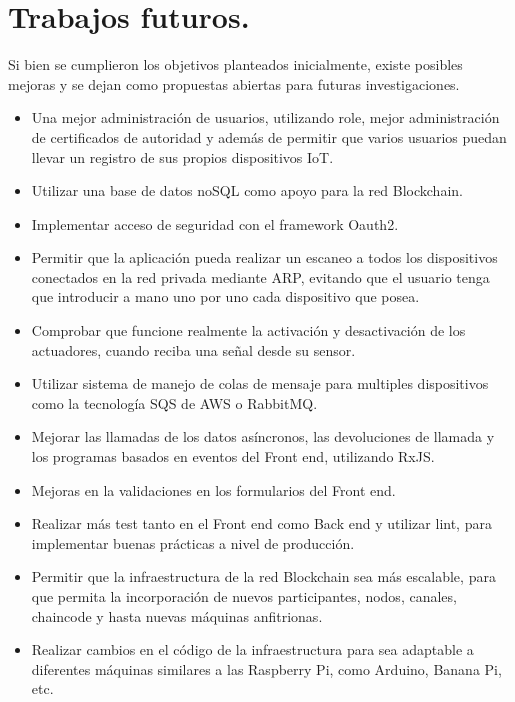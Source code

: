 \section{Trabajos futuros.}

Si bien se cumplieron los objetivos planteados inicialmente, existe posibles mejoras y se dejan como propuestas abiertas
para futuras investigaciones.

\begin{itemize}
  \item Una mejor administración de usuarios, utilizando role, mejor administración de certificados de autoridad y además
  de permitir que varios usuarios puedan llevar un registro de sus propios dispositivos IoT.
  \item Utilizar una base de datos noSQL como apoyo para la red Blockchain.
  \item Implementar acceso de seguridad con el framework Oauth2.
  \item Permitir que la aplicación pueda realizar un escaneo a todos los dispositivos conectados en la red privada mediante 
  ARP, evitando que el usuario tenga que introducir a mano uno por uno cada dispositivo que posea.
  \item Comprobar que funcione realmente la activación y desactivación de los actuadores, cuando reciba una señal desde su 
  sensor.
  \item Utilizar sistema de manejo de colas de mensaje para multiples dispositivos como la tecnología SQS de AWS o RabbitMQ.
  \item Mejorar las llamadas de los datos asíncronos, las devoluciones de llamada y los programas basados en eventos del 
  Front end, utilizando RxJS.
  \item Mejoras en la validaciones en los formularios del Front end.
  \item Realizar más test tanto en el Front end como Back end y utilizar lint, para implementar buenas prácticas a nivel de 
  producción.
  \item Permitir que la infraestructura de la red Blockchain sea más escalable, para que permita la incorporación de nuevos 
  participantes, nodos, canales, chaincode y hasta nuevas máquinas anfitrionas.
  \item Realizar cambios en el código de la infraestructura para sea adaptable a diferentes máquinas similares a las 
  Raspberry Pi, como Arduino, Banana Pi, etc.
\end{itemize}

\newpage


